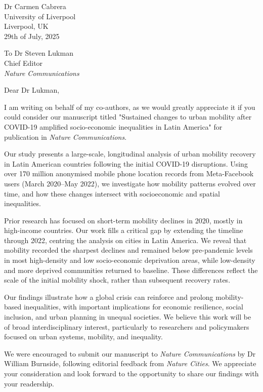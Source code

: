 \documentclass[fleqn,10pt]{letter}
\begin{document}
\begin{flushright}
Dr Carmen Cabrera\\
University of Liverpool\\
Liverpool, UK\\
29th of July, 2025\\
\end{flushright}

\begin{flushleft}
To Dr Steven Lukman \\
Chief Editor \\
\textit{Nature Communications} \\
\end{flushleft} 

Dear Dr Lukman,

I am writing on behalf of my co-authors, as we would greatly appreciate it if you could consider our manuscript titled "Sustained changes to urban mobility after COVID-19 amplified socio-economic inequalities in Latin America" for publication in \textit{Nature Communications}.

Our study presents a large-scale, longitudinal analysis of urban mobility recovery in Latin American countries following the initial COVID-19 disruptions. Using over 170 million anonymised mobile phone location records from Meta-Facebook users (March 2020–May 2022), we investigate how mobility patterns evolved over time, and how these changes intersect with socioeconomic and spatial inequalities.

Prior research has focused on short-term mobility declines in 2020, mostly in high-income countries. Our work fills a critical gap by extending the timeline through 2022, centring the analysis on cities in Latin America. We reveal that mobility recorded the sharpest declines and remained below pre-pandemic levels in most high-density and low socio-economic deprivation areas, while low-density and more deprived communities returned to baseline. These differences reflect the scale of the initial mobility shock, rather than subsequent recovery rates. 

Our findings illustrate how a global crisis can reinforce and prolong mobility-based inequalities, with important implications for economic resilience, social inclusion, and urban planning in unequal societies. We believe this work will be of broad interdisciplinary interest, particularly to researchers and policymakers focused on urban systems, mobility, and inequality.

We were encouraged to submit our manuscript to \textit{Nature Communications} by Dr William Burnside, following editorial feedback from \textit{Nature Cities}. We appreciate your consideration and look forward to the opportunity to share our findings with your readership.
\end{document}
